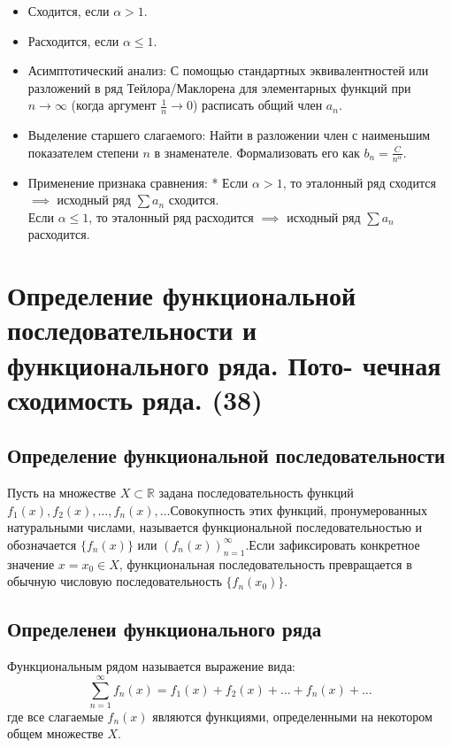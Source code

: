 \documentclass[14pt]{extreport}
\begin{document}
    \begin{itemize}
        \item Сходится, если $\alpha > 1$.
        \item Расходится, если $\alpha \le 1$.
    \end{itemize}
    \begin{itemize}
        \item Асимптотический анализ: С помощью стандартных эквивалентностей или разложений в ряд Тейлора/Маклорена для элементарных функций при $n \to \infty$ (когда аргумент $\frac{1}{n} \to 0$) расписать общий член $a_n$.
        \item Выделение старшего слагаемого: Найти в разложении член с наименьшим показателем степени $n$ в знаменателе. Формализовать его как $b_n = \frac{C}{n^\alpha}$.
        \item Применение признака сравнения: * Если $\alpha > 1$, то эталонный ряд сходится $\implies$ исходный ряд $\sum a_n$ сходится. \\
        Если $\alpha \le 1$, то эталонный ряд расходится $\implies$ исходный ряд $\sum a_n$ расходится.
    \end{itemize}



    \chapter{Определение функциональной последовательности и функционального ряда. Пото-
чечная сходимость ряда. (38)}


    \section{Определение функциональной последовательности}

    \begin{definition}
        Пусть на множестве $X \subset \mathbb{R}$ задана последовательность функций $f_1(x), f_2(x), \dots, f_n(x), \dots$Совокупность этих функций, пронумерованных натуральными числами, называется функциональной последовательностью и обозначается $\{f_n(x)\}$ или $(f_n(x))_{n=1}^{\infty}$.Если зафиксировать конкретное значение $x = x_0 \in X$, функциональная последовательность превращается в обычную числовую последовательность $\{f_n(x_0)\}$.
    \end{definition}


    \section{Определенеи функционального ряда}
    \begin{definition}
        Функциональным рядом называется выражение вида:$$\sum_{n=1}^{\infty} f_n(x) = f_1(x) + f_2(x) + \dots + f_n(x) + \dots$$где все слагаемые $f_n(x)$ являются функциями, определенными на некотором общем множестве $X$.
    \end{definition}
\end{document}
